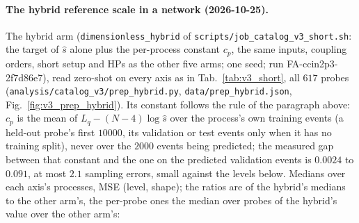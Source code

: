 \documentclass[11pt]{article}
\newcommand{\code}[1]{\texttt{#1}}
\begin{document}
\paragraph{The hybrid reference scale in a network (2026-10-25).} The hybrid arm (\code{dimensionless\_hybrid} of
\code{scripts/job\_catalog\_v3\_short.sh}: the target of $\hat s$ alone plus the per-process constant $c_p$, the same
inputs, coupling orders, short setup and HPs as the other five arms; one seed; run FA-ccin2p3-2f7d86e7), read zero-shot
on every axis as in Tab.~\ref{tab:v3_short}, all $617$ probes (\code{analysis/catalog\_v3/prep\_hybrid.py},
\code{data/prep\_hybrid.json}, Fig.~\ref{fig:v3_prep_hybrid}). Its constant follows the rule of the paragraph above:
$c_p$ is the mean of $L_q-(N-4)\log\hat s$ over the process's own training events (a held-out probe's first $10000$,
its validation or test events only when it has no training split), never over the $2000$ events being predicted; the
measured gap between that constant and the one on the predicted validation events is
$0.0024$ to $0.091$, at most $2.1$ sampling errors, small against the levels below.
Medians over each axis's processes, MSE (level, shape); the ratios are of the hybrid's medians to the other arm's,
the per-probe ones the median over probes of the hybrid's value over the other arm's:
\end{document}
